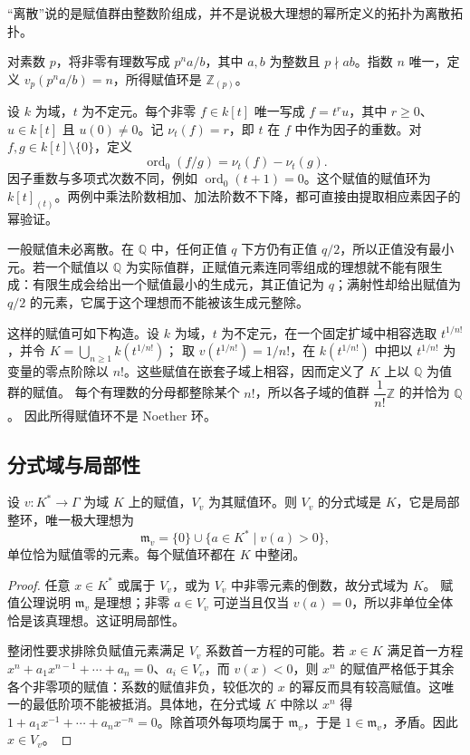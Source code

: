 “离散”说的是赋值群由整数阶组成，并不是说极大理想的幂所定义的拓扑为离散拓扑。

\ProseParagraphBreak
对素数 \(p\)，将非零有理数写成 \(p^n a/b\)，其中 \(a,b\) 为整数且 \(p\nmid ab\)。指数 \(n\) 唯一，定义 \(v_p(p^na/b)=n\)，所得赋值环是 \(\mathbb Z_{(p)}\)。

\ProseParagraphBreak
设 \(k\) 为域，\(t\) 为不定元。每个非零 \(f\in k[t]\) 唯一写成 \(f=t^ru\)，其中 \(r\ge0\)、\(u\in k[t]\) 且 \(u(0)\ne0\)。记 \(\nu_t(f)=r\)，即 \(t\) 在 \(f\) 中作为因子的重数。对 \(f,g\in k[t]\setminus\{0\}\)，定义
\[
	\operatorname{ord}_0(f/g)=\nu_t(f)-\nu_t(g).
\]
因子重数与多项式次数不同，例如 \(\operatorname{ord}_0(t+1)=0\)。这个赋值的赋值环为 \(k[t]_{(t)}\)。两例中乘法阶数相加、加法阶数不下降，都可直接由提取相应素因子的幂验证。

\ProseParagraphBreak
一般赋值未必离散。在 \(\mathbb Q\) 中，任何正值 \(q\) 下方仍有正值 \(q/2\)，所以正值没有最小元。若一个赋值以 \(\mathbb Q\) 为实际值群，正赋值元素连同零组成的理想就不能有限生成：有限生成会给出一个赋值最小的生成元，其正值记为 \(q\)；满射性却给出赋值为 \(q/2\) 的元素，它属于这个理想而不能被该生成元整除。

\ProseParagraphBreak
这样的赋值可如下构造。设 \(k\) 为域，\(t\) 为不定元，在一个固定扩域中相容选取 \(t^{1/n!}\)，并令 \(K=\bigcup_{n\ge1}k(t^{1/n!})\)； 取 \(v(t^{1/n!})=1/n!\)，在 \(k(t^{1/n!})\) 中把以 \(t^{1/n!}\) 为变量的零点阶除以 \(n!\)。这些赋值在嵌套子域上相容，因而定义了 \(K\) 上以 \(\mathbb Q\) 为值群的赋值。 每个有理数的分母都整除某个 \(n!\)，所以各子域的值群 \(\dfrac1{n!}\mathbb Z\) 的并恰为 \(\mathbb Q\)。 因此所得赋值环不是 Noether 环。

\subsection{分式域与局部性}
\label{b3:subsec:1001:03}

\begin{proposition}\label{b3:prop:valuation-local-normal}
	设 \(v:K^*\rightarrow\Gamma\) 为域 \(K\) 上的赋值，\(V_v\) 为其赋值环。则 \(V_v\) 的分式域是 \(K\)，它是局部整环，唯一极大理想为
	\[
		\mathfrak m_v=\{0\}\cup\bigl\{a\in K^*\mid v(a)>0\bigr\},
	\]
	单位恰为赋值零的元素。每个赋值环都在 \(K\) 中整闭。
\end{proposition}
\begin{proof}
	任意 \(x\in K^*\) 或属于 \(V_v\)，或为 \(V_v\) 中非零元素的倒数，故分式域为 \(K\)。 赋值公理说明 \(\mathfrak m_v\) 是理想；非零 \(a\in V_v\) 可逆当且仅当 \(v(a)=0\)，所以非单位全体恰是该真理想。这证明局部性。

	整闭性要求排除负赋值元素满足 \(V_v\) 系数首一方程的可能。若 \(x\in K\) 满足首一方程 \(x^n+a_1x^{n-1}+\cdots+a_n=0\)、\(a_i\in V_v\)，而 \(v(x)<0\)，则 \(x^n\) 的赋值严格低于其余各个非零项的赋值：系数的赋值非负，较低次的 \(x\) 的幂反而具有较高赋值。这唯一的最低阶项不能被抵消。具体地，在分式域 \(K\) 中除以 \(x^n\) 得 \(1+a_1x^{-1}+\cdots+a_nx^{-n}=0\)。除首项外每项均属于 \(\mathfrak m_v\)，于是 \(1\in\mathfrak m_v\)，矛盾。因此 \(x\in V_v\)。
\end{proof}

